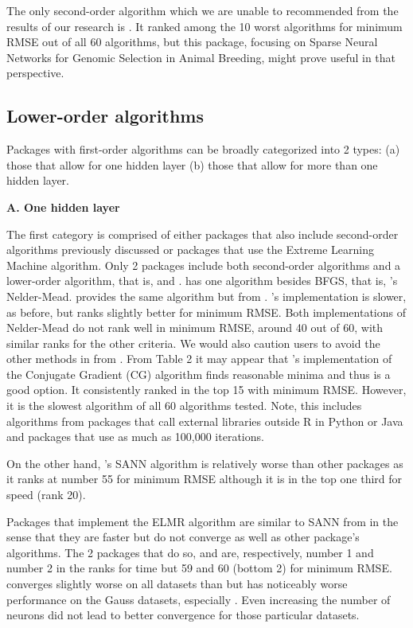 The only second-order algorithm which we are unable to recommended from
the results of our research is  \citep{R-snnR}. It ranked
among the 10 worst algorithms for minimum RMSE out of all 60 algorithms,
but this package, focusing on Sparse Neural Networks for Genomic
Selection in Animal Breeding, might prove useful in that perspective.

\hypertarget{lower-order-algorithms}{%
\subsection{Lower-order algorithms}\label{lower-order-algorithms}}

Packages with first-order algorithms can be broadly categorized into 2
types: (a) those that allow for one hidden layer (b) those that allow
for more than one hidden layer.

\textbf{A. One hidden layer}

The first category is comprised of either packages that also include
second-order algorithms previously discussed or packages that use the
Extreme Learning Machine algorithm. Only 2 packages include both
second-order algorithms and a lower-order algorithm, that is,
 and .  has one
algorithm besides BFGS, that is, 's Nelder-Mead.
 provides the same algorithm but from .
's implementation is slower, as before, but ranks
slightly better for minimum RMSE. Both implementations of Nelder-Mead do
not rank well in minimum RMSE, around 40 out of 60, with similar ranks
for the other criteria. We would also caution users to avoid the other
methods in  from . From Table 2 it may
appear that 's implementation of the Conjugate
Gradient (CG) algorithm finds reasonable minima and thus is a good
option. It consistently ranked in the top 15 with minimum RMSE. However,
it is the slowest algorithm of all 60 algorithms tested. Note, this
includes algorithms from packages that call external libraries outside
\textsf{R} in \textsf{Python} or \textsf{Java} and packages that use as
much as 100,000 iterations.

On the other hand, 's SANN algorithm is relatively
worse than other packages as it ranks at number 55 for minimum RMSE
although it is in the top one third for speed (rank 20).

Packages that implement the ELMR algorithm are similar to SANN from
 in the sense that they are faster but do not converge
as well as other package's algorithms. The 2 packages that do so,
 \citep{R-elmNNRcpp} and 
\citep{R-ELMR} are, respectively, number 1 and number 2 in the ranks for
time but 59 and 60 (bottom 2) for minimum RMSE.  converges
slightly worse on all datasets than  but has
noticeably worse performance on the Gauss datasets, especially
. Even increasing the number of neurons did not lead to
better convergence for those particular datasets.

